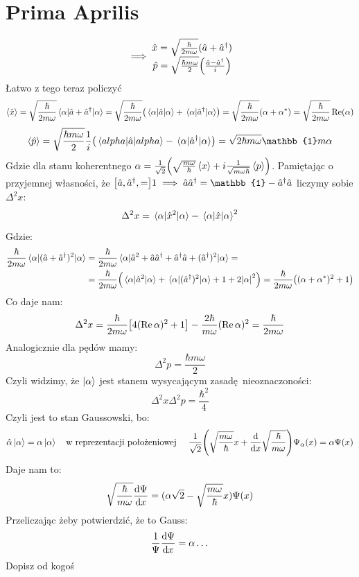 \documentclass[12pt,a4paper]{report}
\newcommand{\com}[1]{{\color{red} #1}}
\newcommand{\phat}{\hat{p}}
\newcommand{\xhat}{\hat{x}}
\newcommand{\ahat}{\hat{a}}
\newcommand{\Id}{\mathbb{1}}
\newenvironment{lecture}[1]{\par\medskip
   \noindent\chapter{#1} \rmfamily}{\medskip}
\begin{document}
\begin{lecture}{Prima Aprilis}
\[        \implies
        \mqty{
        \xhat = \sqrt{\frac{\hbar}{2 m \omega}}(\hat{a} + \hat{a}^\dagger)\\
        \phat = \sqrt{\frac{\hbar m \omega}{2}}\qty(\frac{\hat{a} - \hat{a}^\dagger}{i})
        }
    \]
    Łatwo z tego teraz policzyć 
    \[
    \ev{\xhat} = \sqrt{\frac{\hbar}{2 m \omega}}\ev{\hat{a} + \hat{a}^\dagger}{\alpha} = \sqrt{\frac{\hbar}{2 m \omega}} \qty(\ev{\hat{a}}{\alpha} + \ev{\hat{a}^\dagger}{\alpha}) = \sqrt{\frac{\hbar}{2 m \omega}} (\alpha + \alpha^\ast) = \sqrt{\frac{\hbar}{2 m \omega}} \Re(\alpha)
    \]
    \[
        \ev{\phat} = \sqrt{\frac{\hbar m \omega}{2}} \frac{1}{i} \qty(\ev{\hat{a}}{alpha} - \ev{\hat{a}^\dagger}{\alpha}) = \sqrt{2 \hbar m \omega} \Id m \alpha 
    \]
    Gdzie dla stanu koherentnego $\alpha = \frac{1}{\sqrt{2}}\qty(\sqrt{\frac{m \omega}{\hbar}} \ev{x} + i \frac{1}{\sqrt{m\omega\hbar}}\ev{p})$. Pamiętając o przyjemnej własności, że $\comm{\hat{a}, \hat{a}^\dagger} = 1 \implies \hat{a}\hat{a}^\dagger = \Id - \hat{a}^\dagger\hat{a}$ liczymy sobie $\Delta^2 x$:
    \[
        \Delta^2 x = \ev{\xhat^2}{\alpha} - \ev{\xhat}{\alpha}^2
    \]
    Gdzie:
    \begin{align*}
        \frac{\hbar}{2m\omega} \ev{(\hat{a}+\hat{a}^\dagger)^2}{\alpha} &= \frac{\hbar}{2 m \omega} \ev{\ahat^2 + \ahat\ahat^\dagger + \ahat^\dagger\ahat + (\ahat^\dagger)^2}{\alpha} = \\
        &= \frac{\hbar}{2m\omega}\qty(\ev{\ahat^2}{\alpha} + \ev{(\ahat^\dagger)^2}{\alpha} + 1 + 2 \abs{\alpha}^2) = \frac{\hbar}{2 m \omega}\qty((\alpha + \alpha^\ast)^2 + 1)
    \end{align*}
    Co daje nam:
    \[
        \Delta^2 x = \frac{\hbar}{2m\omega} \qty[4 (\Re\alpha)^2 + 1] - \frac{2 \hbar}{m \omega}(\Re\alpha)^2 = \frac{\hbar}{2 m \omega}
    \]
    Analogicznie dla pędów mamy:
    \[
        \Delta^2 p = \frac{\hbar m \omega}{2}
    \]
    Czyli widzimy, że $\ket{\alpha}$ jest stanem wysycającym zasadę nieoznaczoności:
    \[
        \Delta^2x\Delta^2p = \frac{\hbar^2}{4}
    \]
    Czyli jest to stan Gaussowski, bo:
    \[
        \hat{\alpha}\ket{\alpha} = \alpha\ket{\alpha} \qq{w reprezentacji położeniowej } \frac{1}{\sqrt{2}}\qty(\sqrt{\frac{m \omega}{\hbar}} x + \dv{x} \sqrt{\frac{\hbar}{m \omega}}) \Psi_\alpha(x) = \alpha\Psi(x)
    \]
    Daje nam to:
    \[
        \sqrt{\frac{\hbar}{m\omega}} \dv{\Psi}{x} = (\alpha\sqrt{2} - \sqrt{\frac{m \omega}{\hbar}} x) \Psi(x) 
    \]
    Przeliczając żeby potwierdzić, że to Gauss:
    \[
        \frac{1}{\Psi} \dv{\Psi}{x} = \alpha \dots
    \]
    \com{Dopisz od kogoś}
    
\end{lecture}
\end{document}
